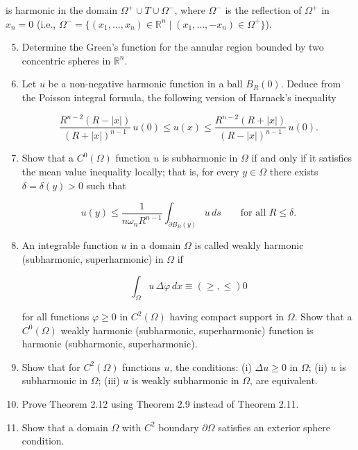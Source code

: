 
is harmonic in the domain $\Omega^+ \cup T \cup \Omega^-$, where $\Omega^-$ is the reflection of $\Omega^+$ in $x_n=0$ (i.e., $\Omega^-=\{(x_1,\ldots,x_n)\in\mathbb{R}^n\mid (x_1,\ldots,-x_n)\in\Omega^+\}$).

\begin{enumerate}
\setcounter{enumi}{4}
\item[2.5.] Determine the Green's function for the annular region bounded by two concentric spheres in $\mathbb{R}^n$.

\item[2.6.] Let $u$ be a non-negative harmonic function in a ball $B_R(0)$. Deduce from the Poisson integral formula, the following version of Harnack's inequality

\[
\frac{R^{n-2}(R-|x|)}{(R+|x|)^{n-1}}\,u(0)\le u(x)\le \frac{R^{n-2}(R+|x|)}{(R-|x|)^{n-1}}\,u(0).
\]

\item[2.7.] Show that a $C^0(\Omega)$ function $u$ is subharmonic in $\Omega$ if and only if it satisfies the mean value inequality locally; that is, for every $y\in\Omega$ there exists $\delta=\delta(y)>0$ such that

\[
u(y)\le \frac{1}{n\omega_n R^{n-1}}\int_{\partial B_R(y)} u\,ds \qquad \text{for all } R\le \delta.
\]

\item[2.8.] An integrable function $u$ in a domain $\Omega$ is called weakly harmonic (subharmonic, superharmonic) in $\Omega$ if

\[
\int_\Omega u\,\Delta\varphi\,dx \equiv (\ge,\le) 0
\]

for all functions $\varphi\ge 0$ in $C^2(\Omega)$ having compact support in $\Omega$. Show that a $C^0(\Omega)$ weakly harmonic (subharmonic, superharmonic) function is harmonic (subharmonic, superharmonic).

\item[2.9.] Show that for $C^2(\Omega)$ functions $u$, the conditions: (i) $\Delta u\ge 0$ in $\Omega$; (ii) $u$ is subharmonic in $\Omega$; (iii) $u$ is weakly subharmonic in $\Omega$, are equivalent.

\item[2.10.] Prove Theorem 2.12 using Theorem 2.9 instead of Theorem 2.11.

\item[2.11.] Show that a domain $\Omega$ with $C^2$ boundary $\partial\Omega$ satisfies an exterior sphere condition.


\end{enumerate}
